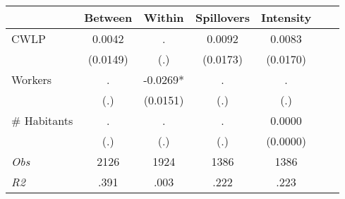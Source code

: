 \begin{tabular}{l*{6}{c}}\hline&\multicolumn{1}{c}{Between}&\multicolumn{1}{c}{Within}&\multicolumn{1}{c}{Spillovers}&\multicolumn{1}{c}{Intensity}\\ \hline 
CWLP & 0.0042 & . & 0.0092 & 0.0083 \\
 & (0.0149) & (.) & (0.0173) & (0.0170) \\
Workers & . & -0.0269* & . & . \\
 & (.) & (0.0151) & (.) & (.) \\
\# Habitants & . & . & . & 0.0000 \\
  & (.) & (.) & (.) & (0.0000) \\
\hline \textit{Obs} & 2126 & 1924 & 1386 & 1386  \\ \textit{R2} & .391 & .003 & .222 & .223 \\ \hline \end{tabular}
